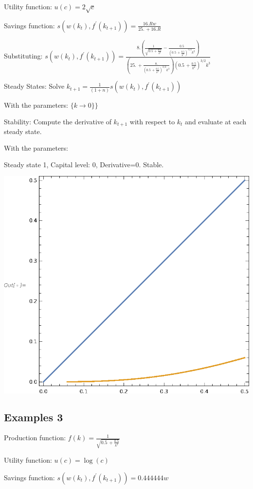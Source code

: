 \documentclass[11pt, a4paper]{article}
\begin{document}
Utility function:       $u(c)=2 \sqrt{c}$

Savings function:       $s(w(k_t),f^\prime(k_{t+1}))= \frac{16. R w}{25.\, +16. R}$

Substituting:           $s(w(k_t),f^\prime(k_{t+1}))= \frac{8. \left(\frac{1}{\sqrt{0.5\, +\frac{0.5}{k^2}}}-\frac{0.5}{\left(0.5\, +\frac{0.5}{k^2}\right)^{3/2} k^2}\right)}{\left(25.\, +\frac{8.}{\left(0.5\, +\frac{0.5}{k^2}\right)^{3/2} k^3}\right) \left(0.5\, +\frac{0.5}{k^2}\right)^{3/2} k^3}$

Steady States:          Solve ${k}_{t+1}= \frac{1}{(1+n)}s(w(k_t),f^\prime(k_{t+1}))$

With the parameters: $\{k\to 0\}\}$

Stability:             Compute the derivative of $k_{t+1}$ with respect to $k_{t}$ and evaluate at each steady state.

With the parameters:

\quad Steady state 1, Capital level: $0$, Derivative=$0$. Stable.

\includegraphics{xamples_gr2.eps}
\subsection*{Examples 3}
Production function:    $f(k)=\frac{1}{\sqrt{0.5\, +\frac{0.5}{k^2}}}$

Utility function:       $u(c)=\log(c)$

Savings function:       $s(w(k_t),f^\prime(k_{t+1}))= 0.444444 w$
\end{document}
